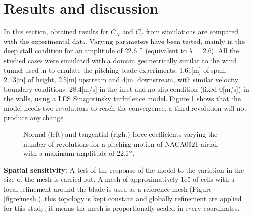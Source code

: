 \documentclass[a4paper]{jpconf}
\begin{document}
\section{Results and discussion}
In this section, obtained results for $C_N$ and $C_T$ from simulations are compared with the experimental data. Varying parameters have been tested, mainly in the deep stall condition for an amplitude of 22.6 $\degree $ (equivalent to $\lambda$ = 2.6). All the studied cases were simulated with a domain geometrically similar to the wind tunnel used in \cite{angell1988collected} to emulate the pitching blade experiments: 1.61[m] of span, 2.13[m] of height, 2.5[m] upstream and 4[m] downstream, with similar velocity boundary conditions: 28.4[m/s] in the inlet and no-slip condition (fixed 0[m/s]) in the walls, using a LES Smagorinsky turbulence model. Figure \ref{revolutions} shows that the model needs two revolutions to reach the convergence, a third revolution will not produce any change.

\begin{figure}[h]
\begin{minipage}{18pc}
\resizebox{\columnwidth}{!}{}
\end{minipage}\hspace{2pc}%
\begin{minipage}{18pc}
\resizebox{\columnwidth}{!}{}
\end{minipage}
\caption{\label{revolutions}Normal (left) and tangential (right) force coefficients varying the number of revolutions for a pitching motion of NACA0021 airfoil with a maximum amplitude of 22.6$\degree$.}
\end{figure}

\textbf{Spatial sensitivity:} A test of the response of the model
to the variation in the size of the mesh is carried out. A mesh of approximatively 1e5 of cells with a local refinement around the blade is used as a reference mesh (Figure \ref{figrefmesh}), this topology is kept constant and globally refinement are applied for this study; it means the mesh is proportionally scaled in every coordinates.
\end{document}
